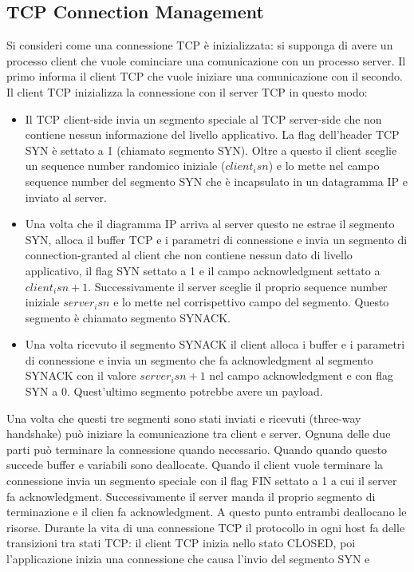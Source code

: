 \subsection{TCP Connection Management}
Si consideri come una connessione TCP \`e inizializzata: si supponga di avere un processo client che vuole cominciare una comunicazione con un processo 
server. Il primo informa il client TCP che vuole iniziare una comunicazione con il secondo. Il client TCP inizializza la connessione con il server TCP in
questo modo:
\begin{itemize}
\item Il TCP client-side invia un segmento speciale al TCP server-side che non contiene nessun informazione del livello applicativo. La flag dell'header TCP
SYN \`e settato a 1 (chiamato segmento SYN). Oltre a questo il client sceglie un sequence number randomico iniziale ($client_isn$) e lo mette nel campo 
sequence number del segmento SYN che \`e incapsulato in un datagramma IP e inviato al server. 
\item Una volta che il diagramma IP arriva al server questo ne estrae il segmento SYN, alloca il buffer TCP e i parametri di connessione e invia un segmento
di connection-granted al client che non contiene nessun dato di livello applicativo, il flag SYN settato a 1 e il campo acknowledgment settato a 
$client_isn+1$. Successivamente il server sceglie il proprio sequence number iniziale $server_isn$ e lo mette nel corrispettivo campo del segmento. Questo
segmento \`e chiamato segmento SYNACK.
\item Una volta ricevuto il segmento SYNACK il client alloca i buffer e i parametri di connessione e invia un segmento che fa acknowledgment al segmento 
SYNACK con il valore $server_isn+1$ nel campo acknowledgment e con flag SYN a 0. Quest'ultimo segmento potrebbe avere un payload. 
\end{itemize}
Una volta che questi tre segmenti sono stati inviati e ricevuti (three-way handshake) pu\`o iniziare la comunicazione tra client e server. Ognuna delle due
parti pu\`o terminare la connessione quando necessario. Quando quando questo succede buffer e variabili sono deallocate. Quando il client vuole terminare la
connessione invia un segmento speciale con il flag FIN settato a 1 a cui il server fa acknowledgment. Successivamente il server manda il proprio segmento di 
terminazione e il clien fa acknowledgment. A questo punto entrambi deallocano le risorse. Durante la vita di una connessione TCP il protocollo in ogni host
fa delle transizioni tra stati TCP: il client TCP inizia nello stato CLOSED, poi l'applicazione inizia una connessione che causa l'invio del segmento SYN e 
